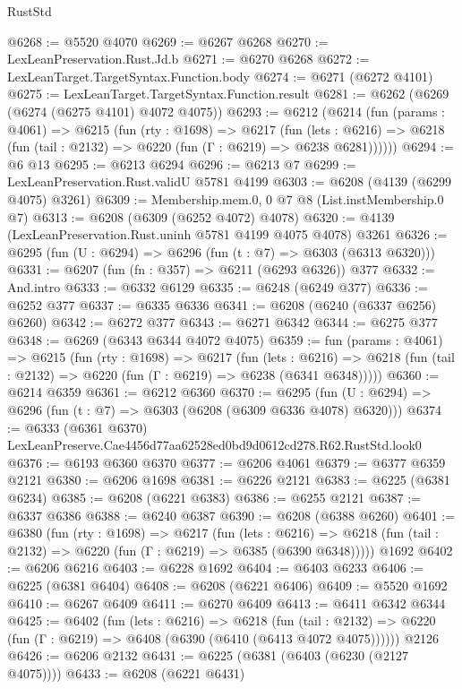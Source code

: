 \begin{lexlean}{RustStd}
\begin{coremodule}
@6268 := @5520 @4070
@6269 := @6267 @6268
@6270 := LexLeanPreservation.Rust.Jd.b
@6271 := @6270 @6268
@6272 := LexLeanTarget.TargetSyntax.Function.body
@6274 := @6271 (@6272 @4101)
@6275 := LexLeanTarget.TargetSyntax.Function.result
@6281 := @6262 (@6269 (@6274 (@6275 @4101) @4072 @4075))
@6293 := @6212
    (@6214
      (fun (params : @4061) =>
      @6215
        (fun (rty : @1698) =>
        @6217
          (fun (lets : @6216) =>
          @6218 (fun (tail : @2132) => @6220 (fun (Γ : @6219) => @6238 @6281))))))
@6294 := @6 @13
@6295 := @6213 @6294
@6296 := @6213 @7
@6299 := LexLeanPreservation.Rust.validU @5781 @4199
@6303 := @6208 (@4139 (@6299 @4075) @3261)
@6309 := Membership.mem.{0, 0} @7 @8 (List.instMembership.{0} @7)
@6313 := @6208 (@6309 (@6252 @4072) @4078)
@6320 := @4139 (LexLeanPreservation.Rust.uninh @5781 @4199 @4075 @4078) @3261
@6326 := @6295 (fun (U : @6294) => @6296 (fun (t : @7) => @6303 (@6313 @6320)))
@6331 := @6207 (fun (fn : @357) => @6211 (@6293 @6326)) @377
@6332 := And.intro
@6333 := @6332 @6129
@6335 := @6248 (@6249 @377)
@6336 := @6252 @377
@6337 := @6335 @6336
@6341 := @6208 (@6240 (@6337 @6256) @6260)
@6342 := @6272 @377
@6343 := @6271 @6342
@6344 := @6275 @377
@6348 := @6269 (@6343 @6344 @4072 @4075)
@6359 := fun (params : @4061) =>
  @6215
    (fun (rty : @1698) =>
    @6217
      (fun (lets : @6216) =>
      @6218 (fun (tail : @2132) => @6220 (fun (Γ : @6219) => @6238 (@6341 @6348)))))
@6360 := @6214 @6359
@6361 := @6212 @6360
@6370 := @6295 (fun (U : @6294) => @6296 (fun (t : @7) => @6303 (@6208 (@6309 @6336 @4078) @6320)))
@6374 := @6333 (@6361 @6370) LexLeanPreserve.Cae4456d77aa62528ed0bd9d0612cd278.R62.RustStd.look0
@6376 := @6193 @6360 @6370
@6377 := @6206 @4061
@6379 := @6377 @6359 @2121
@6380 := @6206 @1698
@6381 := @6226 @2121
@6383 := @6225 (@6381 @6234)
@6385 := @6208 (@6221 @6383)
@6386 := @6255 @2121
@6387 := @6337 @6386
@6388 := @6240 @6387
@6390 := @6208 (@6388 @6260)
@6401 := @6380
    (fun (rty : @1698) =>
    @6217
      (fun (lets : @6216) =>
      @6218 (fun (tail : @2132) => @6220 (fun (Γ : @6219) => @6385 (@6390 @6348)))))
    @1692
@6402 := @6206 @6216
@6403 := @6228 @1692
@6404 := @6403 @6233
@6406 := @6225 (@6381 @6404)
@6408 := @6208 (@6221 @6406)
@6409 := @5520 @1692
@6410 := @6267 @6409
@6411 := @6270 @6409
@6413 := @6411 @6342 @6344
@6425 := @6402
    (fun (lets : @6216) =>
    @6218
      (fun (tail : @2132) => @6220 (fun (Γ : @6219) => @6408 (@6390 (@6410 (@6413 @4072 @4075))))))
    @2126
@6426 := @6206 @2132
@6431 := @6225 (@6381 (@6403 (@6230 (@2127 @4075))))
@6433 := @6208 (@6221 @6431)

\end{coremodule}
\end{lexlean}
